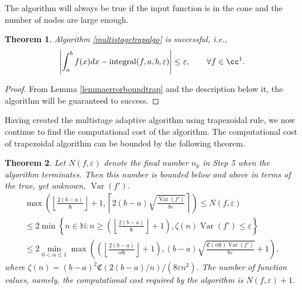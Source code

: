 \documentclass{iitthesis}
\DeclareMathOperator{\Var}{Var}
\newtheorem{theorem}{Theorem}
\theoremstyle{definition}
\theoremstyle{remark}
\begin{document}
The algorithm will always be true if the input function is in the cone and the number of nodes are large enough.
\begin{theorem}\label{thmTrap}
    Algorithm \ref{multistagetrapalgo} is successful, i.e.,
    \begin{equation*}
      \left|\int_{a}^{b}f(x)dx-\textup{integral}(f,a,b,\varepsilon)\right|\le\varepsilon, \qquad \forall f\in \cc^1.
    \end{equation*}
\end{theorem}
\begin{proof}
  From Lemma \ref{lemmaerrorboundtrap} and the description below it, the algorithm will be guaranteed to success.
\end{proof}


Having created the multistage adaptive algorithm using trapezoidal rule, we now continue to find the computational cost of the algorithm. The computational cost of trapezoidal algorithm can be bounded by the following theorem.
\begin{theorem}\label{uppbndcosttrap}
    Let $N(f,\varepsilon)$ denote the final number $n_k$ in Step 5 when the algorithm terminates. Then this number is bounded below and above in terms of the true, yet unknown, $\Var(f')$.
    \begin{multline}\label{uppbndcosttrapineq}
        \max\left(\left\lfloor\frac{2(b-a)}{\mathfrak{h}}\right\rfloor+1,\left\lceil2(b-a)\sqrt{\frac{\Var(f')}{8\varepsilon}}\right\rceil\right)\leq N(f,\varepsilon)\\ \leq 2\min\left\{n\in\mathbb{N}:n\geq\left(\left\lfloor\frac{2(b-a)}{\mathfrak{h}}\right\rfloor+1\right),\zeta(n)\Var(f')\leq\varepsilon\right\}\\ \leq 2\min_{0<\alpha\leq1}\max\left(\left(\left\lfloor\frac{2(b-a)}{\alpha\mathfrak{h}}\right\rfloor+1\right),(b-a)\sqrt{\frac{\mathfrak{C}(\alpha\mathfrak{h})\Var(f')}{8\varepsilon}}+1\right),
    \end{multline}
    where $\zeta(n)=(b-a)^2\mathfrak{C}(2(b-a)/n)/(8\varepsilon n^2)$. The number of function values, namely, the computational cost required by the algorithm is $N(f,\varepsilon)+1$.
\end{theorem}
\end{document}
